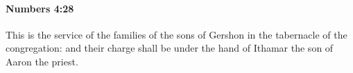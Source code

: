 
		\paragraph{Numbers 4:28} %
			\label{NUMBERS-4-28}

			This is the service of the families of the sons of Gershon in the tabernacle of the congregation: and their charge shall be under the hand of Ithamar the son of Aaron the priest.


